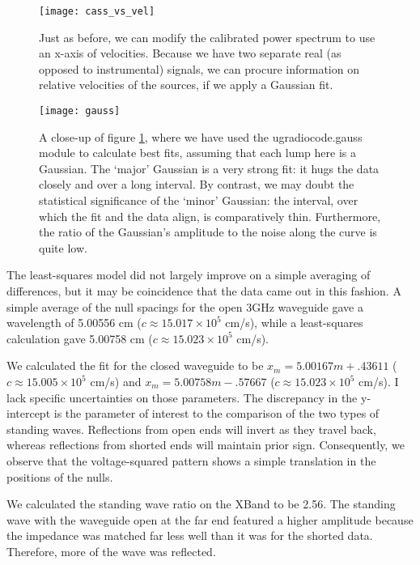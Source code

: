 \documentclass[12pt]{article}
\begin{document}
\begin{figure}
	\centering
	\texttt{[image: cass\_vs\_vel]}
	\caption{Just as before, we can modify the calibrated power spectrum to use an x-axis of velocities. Because we have two separate real (as opposed to instrumental) signals, we can procure information on relative velocities of the sources, if we apply a Gaussian fit.}
	\label{fig:cass_vs_vel}
\end{figure}

\begin{figure}
\centering
	\texttt{[image: gauss]}
	\caption{A close-up of figure \ref{fig:cass_vs_vel}, where we have used the ugradiocode.gauss module to calculate best fits, assuming that each lump here is a Gaussian. The `major' Gaussian is a very strong fit: it hugs the data closely and over a long interval. By contrast, we may doubt the statistical significance of the `minor' Gaussian: the interval, over which the fit and the data align, is comparatively thin. Furthermore, the ratio of the Gaussian's amplitude to the noise along the curve is quite low.}
	\label{fig:gauss}
\end{figure}




The least-squares model did not largely improve on a simple averaging of differences, but it may be coincidence that the data came out in this fashion. A simple average of the null spacings for the open 3GHz waveguide gave a wavelength of 5.00556 cm ($c \approx 15.017 \times 10^5$ cm/s), while a least-squares calculation gave 5.00758 cm ($c \approx 15.023 \times 10^5$ cm/s).

We calculated the fit for the closed waveguide to be $x_m = 5.00167 m + .43611$ ($c \approx 15.005 \times 10^5$ cm/s) and $x_m = 5.00758 m - .57667$ ($c \approx 15.023 \times 10^5$ cm/s). I lack specific uncertainties on those parameters. The discrepancy in the y-intercept is the parameter of interest to the comparison of the two types of standing waves. Reflections from open ends will invert as they travel back, whereas reflections from shorted ends will maintain prior sign. Consequently, we observe that the voltage-squared pattern shows a simple translation in the positions of the nulls.

We calculated the standing wave ratio on the XBand to be 2.56. The standing wave with the waveguide open at the far end featured a higher amplitude because the impedance was matched far less well than it was for the shorted data. Therefore, more of the wave was reflected.
\end{document}
